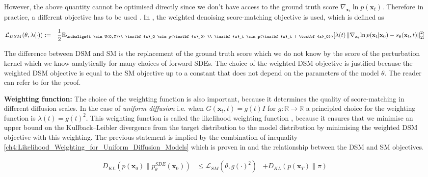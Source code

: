 However, the above quantity cannot be optimised directly since we don't have access to the ground truth score $\nabla_{\textbf{x}_t}{\ln{p(\textbf{x}_t)}}$. Therefore in practice, a different objective has to be used \cite{score_matching, vincent2011connection, song2020score}. In \cite{song2020score}, the weighted denoising score-matching objective is used, which is defined as 

\begin{gather}\label{ch4:DSM_for_uniform_diffusion_models}
\begin{aligned}
    &\mathcal{L}_{DSM}(\theta, \lambda(\cdot)) := 
    &\frac{1}{2} \mathbb{E}_{\subalign{t \sim U(0,T)\\ \textbf{x}_0 \sim p(\textbf{x}_0) \\ \textbf{x}_t \sim p(\textbf{x}_t | \textbf{x}_0)}} [\lambda(t) \norm{\nabla_{\textbf{x}_t}{\ln{p(\textbf{x}_t | \textbf{x}_0)}} - s_\theta(\textbf{x}_t,t)}_2^2]
\end{aligned}
\end{gather}

The difference between DSM and SM is the replacement of the ground truth score which we do not know by the score of the perturbation kernel which we know analytically for many choices of forward SDEs. The choice of the weighted DSM objective is justified because the weighted DSM objective is equal to the SM objective up to a constant that does not depend on the parameters of the model $\theta$. The reader can refer to \cite{vincent2011connection} for the proof. 

\textbf{Weighting function:} The choice of the weighting function is also important, because it determines the quality of score-matching in different diffusion scales. In the case of \textit{uniform diffusion} i.e.  when $G(\textbf{x}_t,t) = g(t) I$ for $g: \mathbb{R} \xrightarrow{} \mathbb{R}$ a principled choice for the weighting function is $\lambda(t) = g(t)^2$. This weighting function is called the likelihood weighting function \cite{song2021maximum}, because it ensures that we minimise an upper bound on the Kullback–Leibler divergence from the target distribution to the model distribution by minimising the weighted DSM objective with this weighting. The previous statement is implied by the combination of inequality \ref{ch4:Likelihood_Weighting_for_Uniform_Diffusion_Models} which is proven in \cite{song2021maximum} and the relationship between the DSM and SM objectives.

\begin{equation}\label{ch4:Likelihood_Weighting_for_Uniform_Diffusion_Models}
\begin{aligned}
    D_{KL}(p(\textbf{x}_0)\parallel p^{SDE}_{\theta}(\textbf{x}_0)) &\leq    \mathcal{L}_{SM}(\theta, g(\cdot)^2) & + D_{KL}(p(\textbf{x}_T)\parallel \pi)
\end{aligned}
\end{equation}

